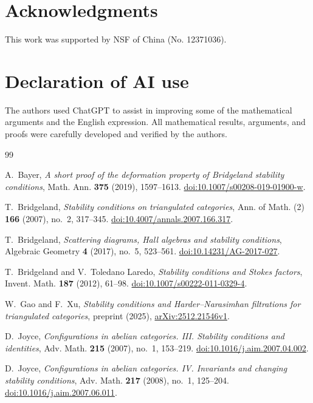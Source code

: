 \documentclass[a4paper,12pt]{amsart}
\numberwithin{equation}{section}
\newcommand{\1}{\mathbf{1}}
\begin{document}
\section*{Acknowledgments}
This work was supported by NSF of China (No. 12371036).

\section*{Declaration of AI use}
The authors used ChatGPT to assist in improving some of the mathematical arguments and the English expression. All mathematical results, arguments, and proofs were carefully developed and verified by the authors.







\begin{thebibliography}{99}

A.~Bayer,
\emph{A short proof of the deformation property of Bridgeland stability conditions},
Math. Ann. \textbf{375} (2019), 1597--1613.
\href{https://doi.org/10.1007/s00208-019-01900-w}{doi:10.1007/s00208-019-01900-w}.

T.~Bridgeland,
\emph{Stability conditions on triangulated categories},
Ann. of Math. (2) \textbf{166} (2007), no.~2, 317--345.
\href{https://doi.org/10.4007/annals.2007.166.317}{doi:10.4007/annals.2007.166.317}.

T.~Bridgeland,
\emph{Scattering diagrams, Hall algebras and stability conditions},
Algebraic Geometry \textbf{4} (2017), no.~5, 523--561.
\href{https://doi.org/10.14231/AG-2017-027}{doi:10.14231/AG-2017-027}.

T.~Bridgeland and V.~Toledano Laredo,
\emph{Stability conditions and Stokes factors},
Invent. Math. \textbf{187} (2012), 61--98.
\href{https://doi.org/10.1007/s00222-011-0329-4}{doi:10.1007/s00222-011-0329-4}.

W.~Gao and F.~Xu,
\emph{Stability conditions and Harder--Narasimhan filtrations for triangulated categories},
preprint (2025),
\href{https://arxiv.org/abs/2512.21546v1}{arXiv:2512.21546v1}.

D.~Joyce,
\emph{Configurations in abelian categories. III. Stability conditions and identities},
Adv. Math. \textbf{215} (2007), no.~1, 153--219.
\href{https://doi.org/10.1016/j.aim.2007.04.002}{doi:10.1016/j.aim.2007.04.002}.

D.~Joyce,
\emph{Configurations in abelian categories. IV. Invariants and changing stability conditions},
Adv. Math. \textbf{217} (2008), no.~1, 125--204.
\href{https://doi.org/10.1016/j.aim.2007.06.011}{doi:10.1016/j.aim.2007.06.011}.


\end{thebibliography}
\end{document}
